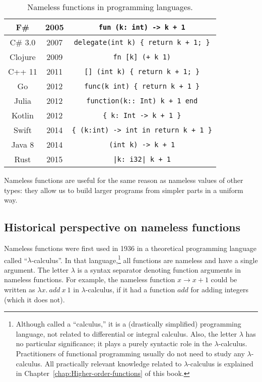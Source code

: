 \begin{wraptable}{r}{0.6\columnwidth}
\begin{centering}
\begin{tabular}{|c|c|c|}
\hline 
{\footnotesize{}F\#} & {\footnotesize{}2005} & \lstinline!fun (k: int) -> k + 1!\tabularnewline
\hline 
{\footnotesize{}C\# 3.0} & {\footnotesize{}2007} & \lstinline!delegate(int k) { return k + 1; }!\tabularnewline
\hline 
{\footnotesize{}Clojure} & {\footnotesize{}2009} & \lstinline!fn [k] (+ k 1)!\tabularnewline
\hline 
{\footnotesize{}C++ 11} & {\footnotesize{}2011} & \lstinline![] (int k) { return k + 1; }!\tabularnewline
\hline 
{\footnotesize{}Go} & {\footnotesize{}2012} & \lstinline!func(k int) { return k + 1 }!\tabularnewline
\hline 
{\footnotesize{}Julia} & {\footnotesize{}2012} & \lstinline!function(k:: Int) k + 1 end!\tabularnewline
\hline 
{\footnotesize{}Kotlin} & {\footnotesize{}2012} & \lstinline!{ k: Int -> k + 1 }!\tabularnewline
\hline 
{\footnotesize{}Swift} & {\footnotesize{}2014} & \lstinline!{ (k:int) -> int in return k + 1 }!\tabularnewline
\hline 
{\footnotesize{}Java 8} & {\footnotesize{}2014} & \lstinline!(int k) -> k + 1!\tabularnewline
\hline 
{\footnotesize{}Rust} & {\footnotesize{}2015} & \lstinline!|k: i32| k + 1!\tabularnewline
\hline 
\end{tabular}
\par\end{centering}
\caption{Nameless functions in programming languages.\label{lambda-functions-table}}
\vspace{-3\baselineskip}
\end{wraptable}%

\noindent Nameless functions are useful for the same reason as nameless
values of other types: they allow us to build larger programs from
simpler parts in a uniform way.

\subsection{Historical perspective on nameless functions}

Nameless functions were first used in 1936 in a theoretical programming
language called \textsf{``}$\lambda$-calculus\textsf{''}.
In that language,\footnote{Although called a \textsf{``}calculus,\textsf{''} it is a (drastically simplified)
programming language, not related to differential or integral calculus.
Also, the letter $\lambda$ has no particular significance; it plays
a purely syntactic role in the $\lambda$-calculus. Practitioners
of functional programming usually do not need to study any $\lambda$-calculus.
All practically relevant knowledge related to $\lambda$-calculus
is explained in Chapter~\ref{chap:Higher-order-functions} of this
book.} all functions are nameless and have a single argument. The letter
$\lambda$ is a syntax separator denoting function arguments in nameless
functions. For example, the nameless function $x\rightarrow x+1$
could be written as $\lambda x.~add~x~1$ in $\lambda$-calculus,
if it had a function $add$ for adding integers (which it does not).

